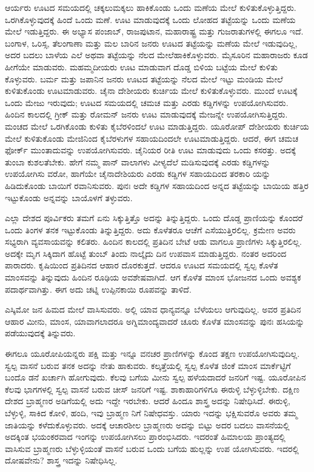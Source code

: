 ಆರ್ಯರು ಊಟದ ಸಮಯದಲ್ಲಿ ಚಕ್ಕಲುಮಕ್ಕಲು ಹಾಕಿಕೊಂಡು ಒಂದು ಮಣೆಯ ಮೇಲೆ ಕುಳಿತುಕೊಳ್ಳುತ್ತಿದ್ದರು. ಒರಗಿಕೊಳ್ಳುವುದಕ್ಕೆ ಹಿಂದೆ ಒಂದು ಮಣೆ. ಊಟ ಮಾಡುವುದಕ್ಕೆ ಒಂದು ಲೋಹದ ತಟ್ಟೆಯನ್ನು ಒಂದು ಮಣೆಯ ಮೇಲೆ ಇಡುತ್ತಿದ್ದರು. ಈ ಅಭ್ಯಾಸ ಪಂಜಾಬ್​, ರಾಜಪುಟಾನ, ಮಹಾರಾಷ್ಟ್ರ ಮತ್ತು ಗುಜರಾತುಗಳಲ್ಲಿ ಈಗಲೂ ಇದೆ. ಬಂಗಾಳ, ಒರಿಸ್ಸ, ತೆಲಂಗಾಣಾ ಮತ್ತು ಮಲ ಬಾರಿನ ಜನರು ಊಟದ ತಟ್ಟೆಯನ್ನು ಮಣೆಯ ಮೇಲೆ ಇಡುವುದಿಲ್ಲ, ಅದರ ಬದಲು ಬಾಳೆಯ ಎಲೆ ಅಥವಾ ತಟ್ಟೆಯನ್ನು ನೆಲದ ಮೇಲೆಹಾಕಿಕೊಳ್ಳುವರು. ಮೈಸೂರಿನ ಮಹಾರಾಜರು ಕೂಡ ಹೀಗೆಯೇ ಮಾಡುವರು. ಮಹಮ್ಮದೀಯರು ಊಟ ಮಾಡುವಾಗ ದೊಡ್ಡ ಬಿಳಿಯ ಬಟ್ಟೆಯ ಮೇಲೆ ಕುಳಿತು ಕೊಳ್ಳುವರು. ಬರ್ಮ ಮತ್ತು ಜಪಾನಿನ ಜನರು ಊಟದ ತಟ್ಟೆಯನ್ನು ನೆಲದ ಮೇಲೆ ಇಟ್ಟು ಮಂಡಿಯ ಮೇಲೆ ಕುಳಿತುಕೊಂಡು ಊಟಮಾಡುವರು. ಚೈನಾ ದೇಶೀಯರು ಕುರ್ಚಿಯ ಮೇಲೆ ಕುಳಿತುಕೊಳ್ಳುವರು. ಮುಂದೆ ಊಟಕ್ಕೆ ಒಂದು ಮೇಜು ಇರುವುದು; ಊಟದ ಸಮಯದಲ್ಲಿ ಚಮಚ ಮತ್ತು ಎರಡು ಕಡ್ಡಿಗಳನ್ನು ಉಪಯೋಗಿಸುವರು. ಹಿಂದಿನ ಕಾಲದಲ್ಲಿ ಗ್ರೀಕ್​ ಮತ್ತು ರೋಮನ್​ ಜನರು ಊಟ ಮಾಡುವುದಕ್ಕೆ ಮೇಜನ್ನೇ ಉಪಯೋಗಿಸುತ್ತಿದ್ದರು. ಮಂಚದ ಮೇಲೆ ಒರಗಿಕೊಂಡು ಕುಳಿತು ಕೈಬೆರಳಿಂದಲೆ ಊಟ ಮಾಡುತ್ತಿದ್ದರು. ಯೂರೋಪ್​ ದೇಶೀಯರು ಕುರ್ಚಿಯ ಮೇಲೆ ಕುಳಿತುಕೊಂಡು ಮೇಜಿನಿಂದ ಕೈಬೆರಳುಗಳ ಸಹಾಯದಿಂದಲೇ ಊಟಮಾಡುತ್ತಿದ್ದರು. ಆದರೆ, ಈಗ ಚಮಚ ಫೋರ್ಕ್​ ಮುಂತಾದುವನ್ನು ಉಪಯೋಗಿಸುವರು. ಚೈನಿಯರ ರೀತಿ ಊಟ ಮಾಡುವುದು ಒಂದು ಕಸರತ್ತು. ಅದಕ್ಕೆ ತುಂಬಾ ಕುಶಲತೆಬೇಕು. ಹೇಗೆ ನಮ್ಮ ಪಾನ್ ವಾಲಾಗಳು ವೀಳ್ಯದೆಲೆ ಮಡಿಸುವುದಕ್ಕೆ ಎರಡು ಕಡ್ಡಿಗಳನ್ನು ಉಪಯೋಗಿಸು ವರೋ, ಹಾಗೆಯೇ ಚೈನಾದೇಶಿಯರು ಎರಡು ಕಡ್ಡಿಗಳ ಸಹಾಯದಿಂದ ತರಕಾರಿ ಯನ್ನು ಹಿಡಿದುಕೊಂಡು ಬಾಯಿಗೆ ರವಾನಿಸುವರು. ಪುನಃ ಅದೇ ಕಡ್ಡಿಗಳ ಸಹಾಯದಿಂದ ಅನ್ನದ ತಟ್ಟೆಯನ್ನು ಬಾಯಿಯ ಹತ್ತಿರ ಇಟ್ಟುಕೊಂಡು ಅನ್ನವನ್ನು ಬಾಯೊಳಗೆ ತಳ್ಳುವರು.

ಎಲ್ಲಾ ದೇಶದ ಪೂರ್ವಿಕರು ತಮಗೆ ಏನು ಸಿಕ್ಕುತ್ತಿತ್ತೊ ಅದನ್ನು ತಿನ್ನುತ್ತಿದ್ದರು. ಒಂದು ದೊಡ್ಡ ಪ್ರಾಣಿಯನ್ನು ಕೊಂದರೆ ಒಂದು ತಿಂಗಳ ತನಕ ಇಟ್ಟುಕೊಂಡು ತಿನ್ನುತ್ತಿದ್ದರು. ಅದು ಕೊಳೆತರೂ ಆಚೆಗೆ ಎಸೆಯುತ್ತಿರಲಿಲ್ಲ. ಕ್ರಮೇಣ ಅವರು ಸಭ್ಯರಾಗಿ ವ್ಯವಸಾಯವನ್ನು ಕಲಿತರು. ಹಿಂದಿನ ಕಾಲದಲ್ಲಿ ಪ್ರತಿದಿನ ಬೇಟೆ ಆಡು ವಾಗಲೂ ಪ್ರಾಣಿಗಳು ಸಿಕ್ಕುತ್ತಿರಲಿಲ್ಲ. ಅದಕ್ಕೇ ಮೃಗ ಸಿಕ್ಕಿದಾಗ ಹೊಟ್ಟೆ ತುಂಬ್ ತಿಂದು ನಾಲ್ಕೈದು ದಿನ ಉಪವಾಸ ಮಾಡುತ್ತಿದ್ದರು. ನಂತರ ಅದರಿಂದ ಪಾರಾದರು. ಕೃಷಿಯಿಂದ ಪ್ರತಿದಿನದ ಆಹಾರ ದೊರಕುತ್ತದೆ. ಆದರೂ ಊಟದ ಸಮಯದಲ್ಲಿ ಸ್ವಲ್ಪ ಕೊಳೆತ ಮಾಂಸವನ್ನು ತಿನ್ನುವುದು ಹಿಂದಿನ ರೂಢಿಯ ಅವಶೇಷವಾಗಿದೆ. ಆಗ ಕೊಳೆತ ಮಾಂಸ ಭೋಜನದ ಒಂದು ಅವಶ್ಯಕ ಪದಾರ್ಥವಾಗಿತ್ತು. ಈಗ ಅದು ಚಟ್ನಿ ಉಪ್ಪಿನಕಾಯಿ ರೂಪವನ್ನು ತಾಳಿದೆ.

ಎಸ್ಕಿಮೋ ಜನ ಹಿಮದ ಮೇಲೆ ವಾಸಿಸುವರು. ಅಲ್ಲಿ ಯಾವ ಧಾನ್ಯವನ್ನೂ ಬೆಳೆಯಲು ಆಗುವುದಿಲ್ಲ. ಅವರ ಪ್ರತಿದಿನ ಆಹಾರ ಮೀನು, ಮಾಂಸ, ಯಾವಾಗಲಾದರೂ ಅಗ್ನಿಮಾಂದ್ಯವಾದರೆ ಚೂರು ಕೊಳೆತ ಮಾಂಸವನ್ನು ಪುನಃ ಹಸಿಯನ್ನು ಪಡೆಯುವುದಕ್ಕೆ ತಿನ್ನುವರು.

ಈಗಲೂ ಯೂರೋಪಿಯನ್ನರು ಪಕ್ಷಿ ಮತ್ತು ಇನ್ನೂ ವನಚರ ಪ್ರಾಣಿಗಳನ್ನು ಕೊಂದ ತಕ್ಷಣ ಉಪಯೋಗಿಸುವುದಿಲ್ಲ. ಸ್ವಲ್ಪ ವಾಸನೆ ಬರುವ ತನಕ ಅದನ್ನು ನೇತು ಹಾಕುವರು. ಕಲ್ಕತ್ತೆಯಲ್ಲಿ ಸ್ವಲ್ಪ ಕೊಳೆತ ಜಿಂಕೆ ಮಾಂಸ ಮಾರ್ಕೆಟ್ಟಿಗೆ ಬಂದೊ ಡನೆ ಖರ್ಚಾಗಿ ಹೋಗುವುದು. ಕೆಲವು ಬಗೆಯ ಮೀನು ಸ್ವಲ್ಪ ಹಳೆಯದಾದರೆ ಜನರಿಗೆ ಇಷ್ಟ. ಯೂರೋಪಿನ ಕೆಲವು ಭಾಗಗಳಲ್ಲಿ ಸ್ವಲ್ಪ ವಾಸನೆ ಬರುವ ಚೀಸ್​ ಜನರಿಗೆ ಇಷ್ಟ. ಶಾಕಾಹಾರಿಗಳಿಗೂ ಈರುಳ್ಳಿ ಬೆಳ್ಳುಳ್ಳಿಬೇಕು. ದಕ್ಷಿಣ ದೇಶದ ಬ್ರಾಹ್ಮಣರ ಅಡಿಗೆಯಲ್ಲಿ ಅದು ಇದ್ದೇ ಇರಬೇಕು. ಆದರೆ ಹಿಂದೂ ಶಾಸ್ತ್ರ ಅದನ್ನು ನಿಷೇಧಿಸಿದೆ. ಈರುಳ್ಳಿ, ಬೆಳ್ಳುಳ್ಳಿ, ಸಾಕಿದ ಕೋಳಿ, ಹಂದಿ, ಇವು ಬ್ರಾಹ್ಮಣ ನಿಗೆ ನಿಷೇಧವಸ್ತು. ಯಾರು ಇದನ್ನು ಭಕ್ಷಿಸುವರೊ ಅವರು ತಮ್ಮ ಜಾತಿಯನ್ನು ಕಳೆದುಕೊಳ್ಳುವರು. ಅದಕ್ಕೆ ಆಚಾರಶೀಲ ಬ್ರಾಹ್ಮಣರು ಅದನ್ನು ಬಿಟ್ಟು ಅದರ ಬದಲು ವಾಸನೆಯಲ್ಲಿ ಅದಕ್ಕಿಂತ ಭಯಂಕರವಾದ ಇಂಗನ್ನು ಉಪಯೋಗಿಸಲು ಪ್ರಾರಂಭಿಸಿದರು. ಇದರಂತೆ ಹಿಮಾಲಯ ಪ್ರಾಂತ್ಯದಲ್ಲಿ ವಾಸಿಸುವ ಬ್ರಾಹ್ಮಣರು ಬೆಳ್ಳುಳ್ಳಿಯಂತೆ ವಾಸನೆ ಬರುವ ಒಂದು ಬಗೆಯ ಹುಲ್ಲನ್ನು ಉಪ ಯೋಗಿಸುವರು. ಇದರಲ್ಲಿ ದೋಷವೇನು? ಶಾಸ್ತ್ರ ಇದನ್ನು ನಿಷೇಧಿಸಿಲ್ಲ.

